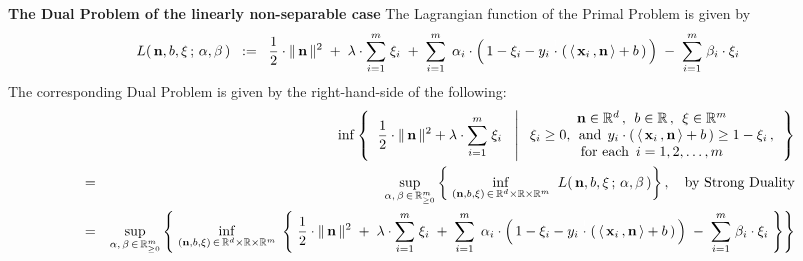 

\vskip 0.5cm
\noindent
\textbf{The Dual Problem of the linearly non-separable case}
\vskip 0.1cm
\noindent
The Lagrangian function of the Primal Problem is given by
\begin{equation*}
L(\,\mathbf{n},b,\xi\,;\,\alpha,\beta\,)
\;\; := \;\;
	\dfrac{1}{2}\cdot\Vert\,\mathbf{n}\,\Vert^{2}
	\; + \;
	\lambda\cdot\overset{m}{\underset{i=1}{\sum}}\;\xi_{i}
	\; + \;
	\overset{m}{\underset{i = 1}{\sum}}\;\,
		\alpha_{i}
		\cdot
		\left(\,
			1 - \xi_{i}
			-
			y_{i}\overset{{\color{white}1}}{\cdot}\left(\,
				\langle\,\mathbf{x}_{i}\,,\mathbf{n}\,\rangle + b
				\,\right)
			\,\right)
	\; - \;
	\overset{m}{\underset{i = 1}{\sum}}\;
		\beta_{i}
		\cdot
		\xi_{i}
\end{equation*}
The corresponding Dual Problem is given by the right-hand-side of the following:
\begin{eqnarray*}
&&
	\inf
	\left\{\;\;
		\dfrac{1}{2}\cdot\Vert\,\mathbf{n}\,\Vert^{2}
		+
		\lambda\cdot\overset{m}{\underset{i=1}{\sum}}\;\xi_{i}
		\;\;\,\left\vert\;
		\begin{array}{c}
			\mathbf{n} \in \Re^{d} \,,\;\, b \in \Re \,,\;\, \xi \in \Re^{m}
			\\
			\xi_{i} \geq 0,\;\,\textnormal{and}\;\,
			y_{i}\cdot\left(\,\langle\,\mathbf{x}_{i}\,,\mathbf{n}\,\rangle + b\,\right) \geq 1 - \xi_{i}\,,
			\\
			\textnormal{for each \,$i = 1,2,\ldots,m$}
			\end{array}
			\right.
		\right\}
\\
& = &
	\underset{\alpha,\,\beta\,\in\,\Re_{\geq 0}^{m}}{\sup}
	\left\{\;
		\underset{(\mathbf{n},b,\xi)\,\in\,\Re^{d}\times\Re\times\Re^{m}}{\inf}\;\;
		L(\,\mathbf{n},b,\xi\,;\,\alpha,\beta\,)
		\right\},
	\quad
	\textnormal{by Strong Duality}
\\
& = &
	\underset{\alpha,\,\beta\,\in\,\Re_{\geq 0}^{m}}{\sup}
	\left\{\;
		\underset{(\mathbf{n},b,\xi)\,\in\,\Re^{d}\times\Re\times\Re^{m}}{\inf}\;
		\left\{\;
			\dfrac{1}{2}\cdot\Vert\,\mathbf{n}\,\Vert^{2}
			\; + \;
			\lambda\cdot\overset{m}{\underset{i=1}{\sum}}\;\xi_{i}
			\; + \;
			\overset{m}{\underset{i = 1}{\sum}}\;\,
				\alpha_{i}
				\cdot
				\left(\,
					1 - \xi_{i}
					-
					y_{i}\overset{{\color{white}1}}{\cdot}\left(\,
						\langle\,\mathbf{x}_{i}\,,\mathbf{n}\,\rangle + b
						\,\right)
					\,\right)
			\; - \;
			\overset{m}{\underset{i = 1}{\sum}}\;
				\beta_{i}
				\cdot
				\xi_{i}
			\;\right\}
		\right\}
\end{eqnarray*}
